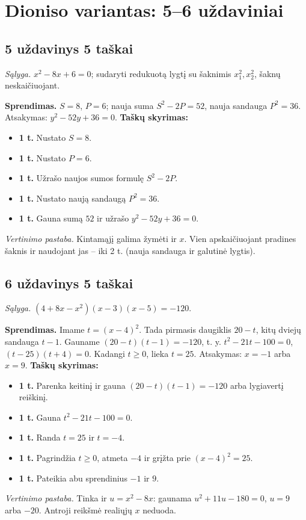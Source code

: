 \documentclass[11pt,a4paper]{article}
\newcommand{\uzd}[3]{\subsection*{#1 uždavinys \hfill #2 taškai}\textit{Sąlyga.} #3\par}
\newcommand{\kriterijai}{\textbf{Taškų skyrimas:}}
\newcommand{\balas}[2]{\item \textbf{#1 t.} #2}
\begin{document}
\section*{Dioniso variantas: 5--6 uždaviniai}
\uzd{5}{5}{$x^2-8x+6=0$; sudaryti redukuotą lygtį su šaknimis $x_1^2,x_2^2$, šaknų neskaičiuojant.}
\textbf{Sprendimas.} $S=8$, $P=6$; nauja suma $S^2-2P=52$, nauja sandauga $P^2=36$. Atsakymas: $y^2-52y+36=0$.
\kriterijai\begin{itemize}
\balas{1}{Nustato $S=8$.}
\balas{1}{Nustato $P=6$.}
\balas{1}{Užrašo naujos sumos formulę $S^2-2P$.}
\balas{1}{Nustato naują sandaugą $P^2=36$.}
\balas{1}{Gauna sumą $52$ ir užrašo $y^2-52y+36=0$.}
\end{itemize}
\textit{Vertinimo pastaba.} Kintamąjį galima žymėti ir $x$. Vien apskaičiuojant pradines šaknis ir naudojant jas -- iki 2 t. (nauja sandauga ir galutinė lygtis).
\uzd{6}{5}{$(4+8x-x^2)(x-3)(x-5)=-120$.}
\textbf{Sprendimas.} Imame $t=(x-4)^2$. Tada pirmasis daugiklis $20-t$, kitų dviejų sandauga $t-1$. Gauname $(20-t)(t-1)=-120$, t. y. $t^2-21t-100=0$, $(t-25)(t+4)=0$. Kadangi $t\ge0$, lieka $t=25$. Atsakymas: $x=-1$ arba $x=9$.
\kriterijai\begin{itemize}
\balas{1}{Parenka keitinį ir gauna $(20-t)(t-1)=-120$ arba lygiavertį reiškinį.}
\balas{1}{Gauna $t^2-21t-100=0$.}
\balas{1}{Randa $t=25$ ir $t=-4$.}
\balas{1}{Pagrindžia $t\ge0$, atmeta $-4$ ir grįžta prie $(x-4)^2=25$.}
\balas{1}{Pateikia abu sprendinius $-1$ ir $9$.}
\end{itemize}
\textit{Vertinimo pastaba.} Tinka ir $u=x^2-8x$: gaunama $u^2+11u-180=0$, $u=9$ arba $-20$. Antroji reikšmė realiųjų $x$ neduoda.
\newpage
\end{document}
